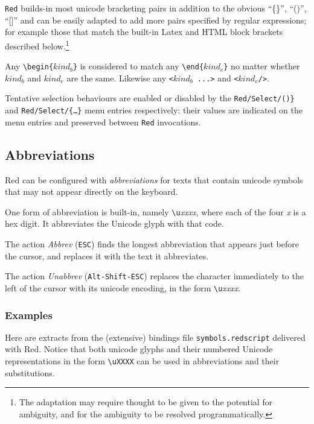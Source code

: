 \documentclass[11pt,a4paper]{article}
\begin{document}
\texttt{Red} builds-in most unicode bracketing pairs in addition to the
obvious ``\{\}'', ``()'', ``{[}{]}'' and can be easily adapted to add
more pairs specified by regular expressions; for example
those that match the built-in Latex and HTML block brackets
described below.\footnote{The adaptation may require thought to be
given to the potential for ambiguity, and for the ambiguity to be
resolved programmatically.}

Any \verb/\begin{/$kind_b$\verb/}/ is considered to match
any \verb/\end{/$kind_e$\verb/}/
no matter whether $kind_b$ and $kind_e$ are the same. Likewise
any \verb/</$kind_b$\verb/ ...>/ and \verb/</$kind_e$\verb|/>|.

Tentative selection behaviours are enabled or disabled by the
\texttt{Red/Select/(\ldots@)\}} and
\texttt{Red/Select/\{\ldots\}} menu entries respectively: their values are
indicated on the menu entries and preserved between \texttt{Red} invocations.

\hypertarget{abbreviations}{%
\subsection{Abbreviations}\label{abbreviations}}

Red can be configured with \emph{abbreviations} for texts that contain
unicode symbols that may not appear directly on the keyboard.

One form of abbreviation is built-in, namely
\texttt{\textbackslash{}u}\emph{xxxx}, where each of the four \emph{x}
is a hex digit. It abbreviates the Unicode glyph with that code.

The action \emph{Abbrev} (\texttt{ESC}) finds the longest abbreviation
that appears just before the cursor, and replaces it with the text it
abbreviates.

The action \emph{Unabbrev} (\texttt{Alt-Shift-ESC}) replaces the
character immediately to the left of the cursor with its unicode
encoding, in the form \texttt{\textbackslash{}u}\emph{xxxx}.

\hypertarget{examples-of-abbreviations}{%
\subsubsection{Examples}\label{examples-of-abbreviations}}

Here are extracts from the (extensive) bindings file
\texttt{symbols.redscript} delivered with Red. Notice that both
unicode glyphs and their numbered Unicode representations in the
form \texttt{\textbackslash{}uXXXX} can be used in abbreviations
and their substitutions.
\end{document}
